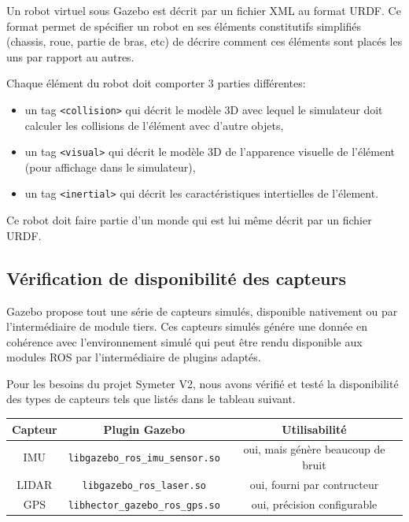 \documentclass[12pt,a4paper]{report}
\begin{document}
		Un robot virtuel sous Gazebo est décrit par un fichier XML au format URDF. Ce format permet de spécifier un robot en ses éléments constitutifs simplifiés (chassis, roue, partie de bras, etc) de décrire comment ces éléments sont placés les uns par rapport au autres.
		
		\para Chaque élément  du robot doit comporter 3 parties différentes:
		\begin{itemize}
			\item un tag \verb|<collision>| qui décrit le modèle 3D avec lequel le simulateur doit calculer les collisions de l'élément avec d'autre objets,
			\item un tag \verb|<visual>| qui décrit le modèle 3D de l'apparence visuelle de l'élément (pour affichage dans le simulateur),
			\item un tag \verb|<inertial>| qui décrit les caractéristiques intertielles de l'élement.
		\end{itemize}
		
		\para Ce robot doit faire partie d'un monde qui est lui même décrit par un fichier URDF. 
		

		
		
		\subsection{Vérification de disponibilité des capteurs}
		
		Gazebo propose tout une série de capteurs simulés, disponible nativement ou par l'intermédiaire de module tiers. Ces capteurs simulés génére une donnée en cohérence avec l'environnement simulé qui peut être rendu disponible aux modules ROS par l'intermédiaire de plugins adaptés.
		
		\para Pour les besoins du projet Symeter V2, nous avons vérifié et testé la disponibilité des types de capteurs tels que listés dans le tableau suivant.
		\newline
		
		\begin{center}
			
		\begin{tabular}{|c|c|c|}
			\hline 
			Capteur & Plugin Gazebo & Utilisabilité \\ 
			\hline 
			IMU & \verb|libgazebo_ros_imu_sensor.so| &  oui, mais génère beaucoup de bruit\\ 
			\hline 
			LIDAR & \verb|libgazebo_ros_laser.so|  & oui, fourni par contructeur \\ 
			\hline 
			GPS & \verb|libhector_gazebo_ros_gps.so| & oui, précision configurable \\ 
			\hline 
		\end{tabular} 
		\end{center}
	
\end{document}

